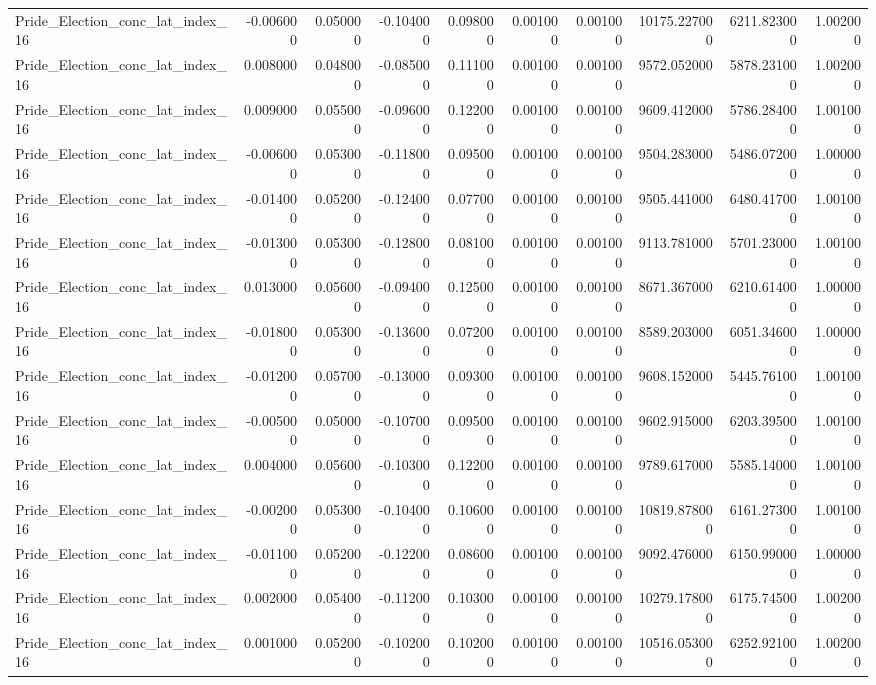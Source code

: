 \begin{table}
\begin{tabular}{lrrrrrrrrr}
Pride_Election_conc_lat_index_16 & -0.006000 & 0.050000 & -0.104000 & 0.098000 & 0.001000 & 0.001000 & 10175.227000 & 6211.823000 & 1.002000 \\
Pride_Election_conc_lat_index_16 & 0.008000 & 0.048000 & -0.085000 & 0.111000 & 0.001000 & 0.001000 & 9572.052000 & 5878.231000 & 1.002000 \\
Pride_Election_conc_lat_index_16 & 0.009000 & 0.055000 & -0.096000 & 0.122000 & 0.001000 & 0.001000 & 9609.412000 & 5786.284000 & 1.001000 \\
Pride_Election_conc_lat_index_16 & -0.006000 & 0.053000 & -0.118000 & 0.095000 & 0.001000 & 0.001000 & 9504.283000 & 5486.072000 & 1.000000 \\
Pride_Election_conc_lat_index_16 & -0.014000 & 0.052000 & -0.124000 & 0.077000 & 0.001000 & 0.001000 & 9505.441000 & 6480.417000 & 1.001000 \\
Pride_Election_conc_lat_index_16 & -0.013000 & 0.053000 & -0.128000 & 0.081000 & 0.001000 & 0.001000 & 9113.781000 & 5701.230000 & 1.001000 \\
Pride_Election_conc_lat_index_16 & 0.013000 & 0.056000 & -0.094000 & 0.125000 & 0.001000 & 0.001000 & 8671.367000 & 6210.614000 & 1.000000 \\
Pride_Election_conc_lat_index_16 & -0.018000 & 0.053000 & -0.136000 & 0.072000 & 0.001000 & 0.001000 & 8589.203000 & 6051.346000 & 1.000000 \\
Pride_Election_conc_lat_index_16 & -0.012000 & 0.057000 & -0.130000 & 0.093000 & 0.001000 & 0.001000 & 9608.152000 & 5445.761000 & 1.001000 \\
Pride_Election_conc_lat_index_16 & -0.005000 & 0.050000 & -0.107000 & 0.095000 & 0.001000 & 0.001000 & 9602.915000 & 6203.395000 & 1.001000 \\
Pride_Election_conc_lat_index_16 & 0.004000 & 0.056000 & -0.103000 & 0.122000 & 0.001000 & 0.001000 & 9789.617000 & 5585.140000 & 1.001000 \\
Pride_Election_conc_lat_index_16 & -0.002000 & 0.053000 & -0.104000 & 0.106000 & 0.001000 & 0.001000 & 10819.878000 & 6161.273000 & 1.001000 \\
Pride_Election_conc_lat_index_16 & -0.011000 & 0.052000 & -0.122000 & 0.086000 & 0.001000 & 0.001000 & 9092.476000 & 6150.990000 & 1.000000 \\
Pride_Election_conc_lat_index_16 & 0.002000 & 0.054000 & -0.112000 & 0.103000 & 0.001000 & 0.001000 & 10279.178000 & 6175.745000 & 1.002000 \\
Pride_Election_conc_lat_index_16 & 0.001000 & 0.052000 & -0.102000 & 0.102000 & 0.001000 & 0.001000 & 10516.053000 & 6252.921000 & 1.002000 \\

\end{tabular}
\end{table}
